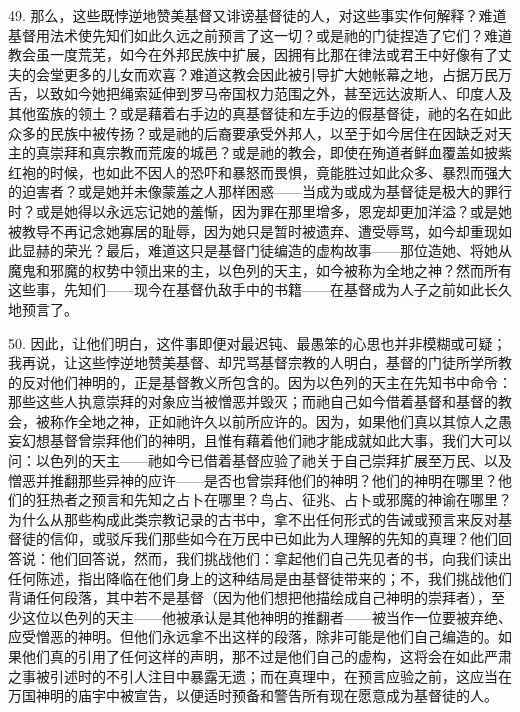 49. 那么，这些既悖逆地赞美基督又诽谤基督徒的人，对这些事实作何解释？难道基督用法术使先知们如此久远之前预言了这一切？或是祂的门徒捏造了它们？难道教会虽一度荒芜，如今在外邦民族中扩展，因拥有比那在律法或君王中好像有了丈夫的会堂更多的儿女而欢喜？难道这教会因此被引导扩大她帐幕之地，占据万民万舌，以致如今她把绳索延伸到罗马帝国权力范围之外，甚至远达波斯人、印度人及其他蛮族的领土？或是藉着右手边的真基督徒和左手边的假基督徒，祂的名在如此众多的民族中被传扬？或是祂的后裔要承受外邦人，以至于如今居住在因缺乏对天主的真崇拜和真宗教而荒废的城邑？或是祂的教会，即使在殉道者鲜血覆盖如披紫红袍的时候，也如此不因人的恐吓和暴怒而畏惧，竟能胜过如此众多、暴烈而强大的迫害者？或是她并未像蒙羞之人那样困惑——当成为或成为基督徒是极大的罪行时？或是她得以永远忘记她的羞惭，因为罪在那里增多，恩宠却更加洋溢？或是她被教导不再记念她寡居的耻辱，因为她只是暂时被遗弃、遭受辱骂，如今却重现如此显赫的荣光？最后，难道这只是基督门徒编造的虚构故事——那位造她、将她从魔鬼和邪魔的权势中领出来的主，以色列的天主，如今被称为全地之神？然而所有这些事，先知们——现今在基督仇敌手中的书籍——在基督成为人子之前如此长久地预言了。\par

50. 因此，让他们明白，这件事即便对最迟钝、最愚笨的心思也并非模糊或可疑；我再说，让这些悖逆地赞美基督、却咒骂基督宗教的人明白，基督的门徒所学所教的反对他们神明的，正是基督教义所包含的。因为以色列的天主在先知书中命令：那些这些人执意崇拜的对象应当被憎恶并毁灭；而祂自己如今借着基督和基督的教会，被称作全地之神，正如祂许久以前所应许的。因为，如果他们真以其惊人之愚妄幻想基督曾崇拜他们的神明，且惟有藉着他们祂才能成就如此大事，我们大可以问：以色列的天主——祂如今已借着基督应验了祂关于自己崇拜扩展至万民、以及憎恶并推翻那些异神的应许——是否也曾崇拜他们的神明？他们的神明在哪里？他们的狂热者之预言和先知之占卜在哪里？鸟占、征兆、占卜或邪魔的神谕在哪里？为什么从那些构成此类宗教记录的古书中，拿不出任何形式的告诫或预言来反对基督徒的信仰，或驳斥我们那些如今在万民中已如此为人理解的先知的真理？他们回答说：他们回答说，然而，我们挑战他们：拿起他们自己先见者的书，向我们读出任何陈述，指出降临在他们身上的这种结局是由基督徒带来的；不，我们挑战他们背诵任何段落，其中若不是基督（因为他们想把他描绘成自己神明的崇拜者），至少这位以色列的天主——他被承认是其他神明的推翻者——被当作一位要被弃绝、应受憎恶的神明。但他们永远拿不出这样的段落，除非可能是他们自己编造的。如果他们真的引用了任何这样的声明，那不过是他们自己的虚构，这将会在如此严肃之事被引述时的不引人注目中暴露无遗；而在真理中，在预言应验之前，这应当在万国神明的庙宇中被宣告，以便适时预备和警告所有现在愿意成为基督徒的人。\par

